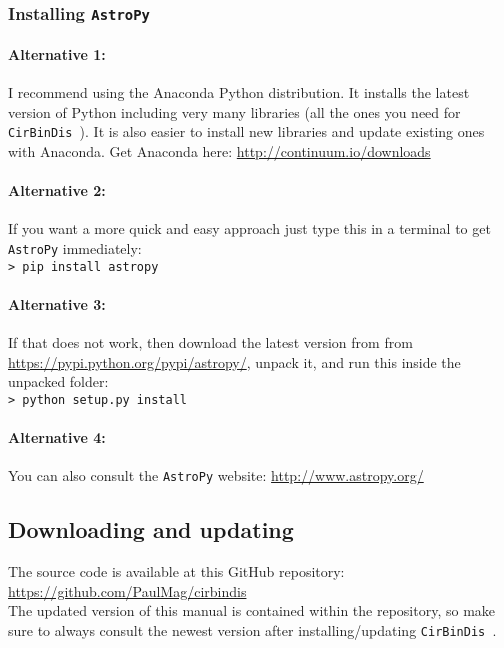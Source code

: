 \documentclass[a4paper, 12pt, english, titlepage]{article}
\newcommand{\sname}{\texttt{CirBinDis }}
\begin{document}
    \subsubsection{Installing \texttt{AstroPy}}
        \paragraph{Alternative 1:}
        I recommend using the Anaconda Python distribution. It installs the latest version of Python including very many libraries (all the ones you need for \sname). It is also easier to install new libraries and update existing ones with Anaconda. 
        Get Anaconda here: \url{http://continuum.io/downloads}

        \paragraph{Alternative 2:}
        If you want a more quick and easy approach just type this in a terminal to get \texttt{AstroPy} immediately: \\
        \texttt{> pip install astropy}

        \paragraph{Alternative 3:}
        If that does not work, then download the latest version from from \url{https://pypi.python.org/pypi/astropy/}, unpack it, and run this inside the unpacked folder: \\
        \texttt{> python setup.py install}

        \paragraph{Alternative 4:}
        You can also consult the \texttt{AstroPy} website: 
        \url{http://www.astropy.org/}


\subsection{Downloading and updating}
    The source code is available at this GitHub repository: \\
    \url{https://github.com/PaulMag/cirbindis} \\
    The updated version of this manual is contained within the repository, so make sure to always consult the newest version after installing/updating \sname. 
\end{document}
